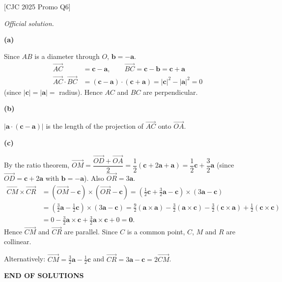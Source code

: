 \documentclass[a4paper,11pt,oneside]{book}
\providecommand{\vv}[1]{\overrightarrow{#1}}\providecommand{\cvv}[3]{\begin{pmatrix}#1\\#2\\#3\end{pmatrix}}
\newcounter{wq}
\newcommand{\Q}[1]{\par\needspace{5\baselineskip}\medskip\stepcounter{wq}\noindent\textbf{\thewq}\quad #1\par}
\begin{document}
\Q{\textcolor{black!60}{\small[CJC 2025 Promo Q6]}\par\smallskip\textit{Official solution.}}
\par\smallskip\noindent\textbf{(a)}\par
Since $AB$ is a diameter through $O$, $\mathbf b=-\mathbf a$.
\begin{align*}
\vv{AC}&=\mathbf c-\mathbf a,\qquad\vv{BC}=\mathbf c-\mathbf b=\mathbf c+\mathbf a\\
\vv{AC}\cdot\vv{BC}&=(\mathbf c-\mathbf a)\cdot(\mathbf c+\mathbf a)=|\mathbf c|^2-|\mathbf a|^2=0
\end{align*}
(since $|\mathbf c|=|\mathbf a|=$ radius). Hence $AC$ and $BC$ are perpendicular.
\par\smallskip\noindent\textbf{(b)}\par
$|\mathbf a\cdot(\mathbf c-\mathbf a)|$ is the length of the projection of $\vv{AC}$ onto $\vv{OA}$.
\par\smallskip\noindent\textbf{(c)}\par
By the ratio theorem, $\vv{OM}=\dfrac{\vv{OD}+\vv{OA}}{2}=\dfrac12(\mathbf c+2\mathbf a+\mathbf a)=\dfrac12\mathbf c+\dfrac32\mathbf a$
(since $\vv{OD}=\mathbf c+2\mathbf a$ with $\mathbf b=-\mathbf a$). Also $\vv{OR}=3\mathbf a$.
\begin{align*}
\vv{CM}\times\vv{CR}
&=\left(\vv{OM}-\mathbf c\right)\times\left(\vv{OR}-\mathbf c\right)
=\left(\tfrac12\mathbf c+\tfrac32\mathbf a-\mathbf c\right)\times(3\mathbf a-\mathbf c)\\
&=\left(\tfrac32\mathbf a-\tfrac12\mathbf c\right)\times(3\mathbf a-\mathbf c)
=\tfrac92(\mathbf a\times\mathbf a)-\tfrac32(\mathbf a\times\mathbf c)-\tfrac32(\mathbf c\times\mathbf a)+\tfrac12(\mathbf c\times\mathbf c)\\
&=0-\tfrac32\mathbf a\times\mathbf c+\tfrac32\mathbf a\times\mathbf c+0=\mathbf 0.
\end{align*}
Hence $\vv{CM}$ and $\vv{CR}$ are parallel. Since $C$ is a common point, $C$, $M$ and $R$ are collinear.

Alternatively: $\vv{CM}=\tfrac32\mathbf a-\tfrac12\mathbf c$ and $\vv{CR}=3\mathbf a-\mathbf c=2\vv{CM}$.
\par\vspace{\baselineskip}\begin{center}\textbf{END OF SOLUTIONS}\end{center}
\end{document}
